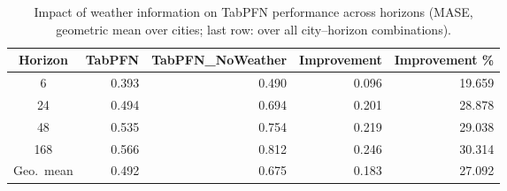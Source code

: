 \begin{table}
\centering
\caption{Impact of weather information on TabPFN performance across horizons (MASE, geometric mean over cities; last row: over all city--horizon combinations).}
\label{tab:tabpfn_weather_cross_city_by_horizon}
\begin{tabular}{crrrr}
\toprule
Horizon & TabPFN & TabPFN\_NoWeather & Improvement & Improvement \% \\
\midrule
6 & 0.393 & 0.490 & 0.096 & 19.659 \\
24 & 0.494 & 0.694 & 0.201 & 28.878 \\
48 & 0.535 & 0.754 & 0.219 & 29.038 \\
168 & 0.566 & 0.812 & 0.246 & 30.314 \\
\midrule
Geo.\ mean & 0.492 & 0.675 & 0.183 & 27.092 \\
\bottomrule
\end{tabular}
\end{table}
